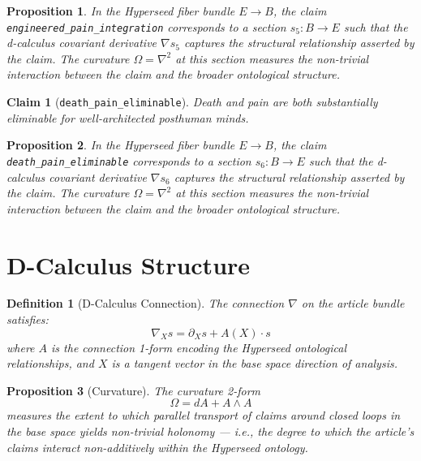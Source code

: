\documentclass{article}
\newtheorem{claim}{Claim}
\newtheorem{definition}{Definition}
\newtheorem{proposition}{Proposition}
\begin{document}
\begin{proposition}
In the Hyperseed fiber bundle $E \to B$, the claim \texttt{engineered_pain_integration} corresponds to a section $s_5: B \to E$ such that the d-calculus covariant derivative $\nabla s_5$ captures the structural relationship asserted by the claim. The curvature $\Omega = \nabla^2$ at this section measures the non-trivial interaction between the claim and the broader ontological structure.
\end{proposition}

\begin{claim}[\texttt{death_pain_eliminable}]
Death and pain are both substantially eliminable for well-architected posthuman minds.
\end{claim}

\begin{proposition}
In the Hyperseed fiber bundle $E \to B$, the claim \texttt{death_pain_eliminable} corresponds to a section $s_6: B \to E$ such that the d-calculus covariant derivative $\nabla s_6$ captures the structural relationship asserted by the claim. The curvature $\Omega = \nabla^2$ at this section measures the non-trivial interaction between the claim and the broader ontological structure.
\end{proposition}

\section{D-Calculus Structure}

\begin{definition}[D-Calculus Connection]
The connection $\nabla$ on the article bundle satisfies:
\begin{equation}
  \nabla_X s = \partial_X s + A(X) \cdot s
\end{equation}
where $A$ is the connection 1-form encoding the Hyperseed ontological relationships, and $X$ is a tangent vector in the base space direction of analysis.
\end{definition}

\begin{proposition}[Curvature]
The curvature 2-form
\begin{equation}
  \Omega = dA + A \wedge A
\end{equation}
measures the extent to which parallel transport of claims around closed loops in the base space yields non-trivial holonomy --- i.e., the degree to which the article's claims interact non-additively within the Hyperseed ontology.
\end{proposition}
\end{document}

